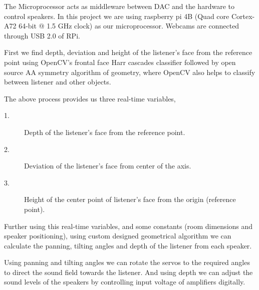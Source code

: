\documentclass[../block_diagram_intro/block_diagram_intro.tex]{subfiles}
\begin{document}
The Microprocessor acts as middleware between DAC and the hardware to control speakers.
In this project we are using raspberry pi 4B (Quad core Cortex-A72 64-bit @ 1.5 GHz clock) 
as our microprocessor. Webcams are connected through USB 2.0 of RPi.

First we find depth, deviation and height of the listener's face from the reference point
using OpenCV's frontal face Harr cascades classifier followed by open source AA symmetry 
algorithm of geometry, where OpenCV also helps to classify between listener and other objects. 

The above process provides us three real-time variables,

\begin{description}
    \item[1.]Depth of the listener's face from the reference point.
    \item[2.]Deviation of the listener's face from center of the axis.
    \item[3.]Height of the center point of listener's face from the origin (reference point).  
\end{description}

Further using this real-time variables, and some constants (room dimensions and speaker positioning),
using custom designed geometrical algorithm we can calculate the panning, tilting angles and depth of 
the listener from each speaker.

Using panning and tilting angles we can rotate the servos to the required angles to direct the sound field
towards the listener. And using depth we can adjust the sound levels of the speakers by controlling
input voltage of amplifiers digitally.
\end{document}
